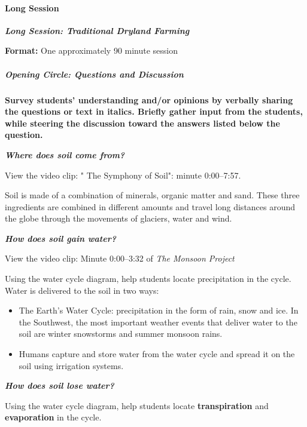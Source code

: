 \documentclass[12pt,]{article}
\providecommand{\tightlist}{%
  \setlength{\itemsep}{0pt}\setlength{\parskip}{0pt}}
\let\oldparagraph\paragraph
\renewcommand{\paragraph}[1]{\oldparagraph{#1}\mbox{}}
\let\oldsubparagraph\subparagraph
\renewcommand{\subparagraph}[1]{\oldsubparagraph{#1}\mbox{}}
\begin{document}
\hypertarget{long-session-2}{%
\paragraph{Long Session}\label{long-session-2}}

\textbf{\emph{Long Session: Traditional Dryland Farming}}

\textbf{Format:} One approximately 90 minute session

\hypertarget{opening-circle-questions-and-discussion}{%
\subparagraph{Opening Circle: Questions and Discussion}\label{opening-circle-questions-and-discussion}}

\textbf{Survey students' understanding and/or opinions by verbally sharing the questions or text in italics. Briefly gather input from the students, while steering the discussion toward the answers listed below the question.}

\textbf{\emph{Where does soil come from?}}

View the video clip: " The Symphony of Soil": minute 0:00--7:57.

Soil is made of a combination of minerals, organic matter and sand. These three ingredients are combined in different amounts and travel long distances around the globe through the movements of glaciers, water and wind.

\textbf{\emph{How does soil gain water? }}

View the video clip: Minute 0:00--3:32 of \emph{The Monsoon Project}

Using the water cycle diagram, help students locate precipitation in the cycle. Water is delivered to the soil in two ways:

\begin{itemize}
\tightlist
\item
  The Earth's Water Cycle: precipitation in the form of rain, snow and ice. In the Southwest, the most important weather events that deliver water to the soil are winter snowstorms and summer monsoon rains.
\item
  Humans capture and store water from the water cycle and spread it on the soil using irrigation systems.
\end{itemize}

\textbf{\emph{How does soil lose water?}}

Using the water cycle diagram, help students locate \textbf{transpiration} and \textbf{evaporation} in the cycle.
\end{document}
